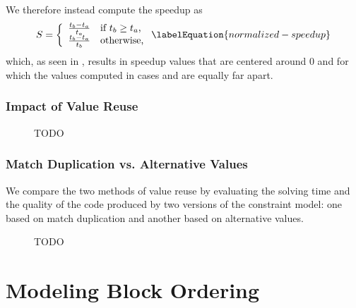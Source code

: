 %
We therefore instead compute the \gls{speedup} as
%
\begin{equation}
  S =
  \left\{
  \begin{array}{ll}
    \frac{t_b - t_a}{t_a} & \text{if $t_b \geq t_a$,} \\
    \frac{t_b - t_a}{t_b} & \text{otherwise,}
  \end{array}
  \right.
  \labelEquation{normalized-speedup}
\end{equation}
%
which, as seen in , results in
\gls{speedup} values that are centered around $0$ and for which the values
computed in cases  and  are equally far apart.


\subsubsection{Impact of Value Reuse}



\begin{figure}
  \centering%
  \maxsizebox{\textwidth}{!}{%
    \trimBarchartPlot{%
    }%
  }

  \caption{TODO}
\end{figure}


\subsubsection{Match Duplication vs. Alternative Values}

We compare the two methods of \gls{value reuse} by evaluating the solving time
and the quality of the code produced by two versions of the \gls{constraint
  model}: one based on \gls{match duplication} and another based on
\glspl{alternative value}.


\begin{figure}
  \centering%
  \maxsizebox{\textwidth}{!}{%
    \trimBarchartPlot{%
    }%
  }

  \caption{TODO}
\end{figure}


\section{Modeling Block Ordering}

